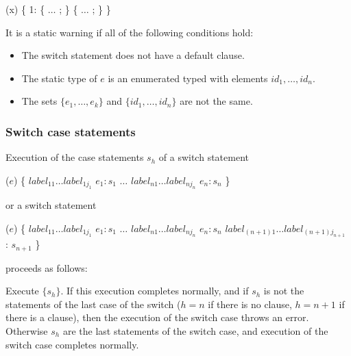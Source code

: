 \documentclass{article}
\begin{document}
\begin{dartCode}
\SWITCH{} (x) \{
  \CASE{} 1: \TRY{} \{ $\ldots$ \RETURN{}; \} \FINALLY{} \{ $\ldots$ \RETURN{}; \}
\}
\end{dartCode}


\LMHash{}
It is a static warning if all of the following conditions hold:
\begin{itemize}
\item The switch statement does not have a default clause.
\item The static type of $e$ is an enumerated typed with elements $id_1, \ldots, id_n$.
\item The sets $\{e_1, \ldots, e_k\} $ and $\{id_1, \ldots, id_n\}$ are not the same.
\end{itemize}



\subsubsection{Switch case statements}

\LMHash{}
Execution of the case statements $s_h$ of a switch statement

\begin{dartCode}
\SWITCH{} ($e$) \{
   $label_{11} \ldots label_{1j_1}$ \CASE{} $e_1: s_1$
   $\ldots$
   $label_{n1} \ldots label_{nj_n}$ \CASE{} $e_n: s_n$
\}
\end{dartCode}

or a switch statement

\begin{dartCode}
\SWITCH{} ($e$) \{
   $label_{11} \ldots label_{1j_1}$ \CASE{} $e_1: s_1$
   $\ldots$
   $label_{n1} \ldots label_{nj_n}$ \CASE{} $e_n: s_n$
   $label_{(n+1)1} \ldots label_{(n+1)j_{n+1}}$ \DEFAULT{}: $s_{n+1}$
\}
\end{dartCode}

proceeds as follows:

\LMHash{}
Execute $\{s_h\}$.
If this execution completes normally,
and if $s_h$ is not the statements of the last case of the switch
($h = n$ if there is no \DEFAULT{} clause,
$h = n+1$ if there is a \DEFAULT{} clause),
then the execution of the switch case throws an error.
Otherwise $s_h$ are the last statements of the switch case,
and execution of the switch case completes normally.
\end{document}
